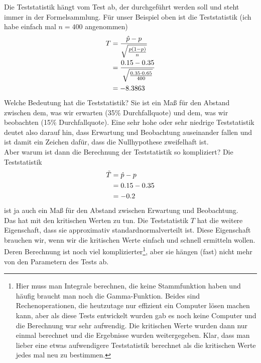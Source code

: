 \documentclass{article}
\begin{document}
	Die Teststatistik hängt vom Test ab, der durchgeführt werden soll und steht immer in der Formelsammlung. Für unser Beispiel oben ist die Teststatistik (ich habe einfach mal $n=400$ angenommen)
	\begin{align}
		T &= \frac{\hat{p} - p}{\sqrt{\frac{p(1-p)}{n}}} \notag \\
		&= \frac{0.15-0.35}{\sqrt{\frac{0.35\cdot 0.65}{400}}} \notag \\
		&= -8.3863 \notag
	\end{align}
	Welche Bedeutung hat die Teststatistik? Sie ist ein Maß für den Abstand zwischen dem, was wir erwarten (35\% Durchfallquote) und dem, was wir beobachten (15\% Durchfallquote). Eine sehr hohe oder sehr niedrige Teststatistik deutet also darauf hin, dass Erwartung und Beobachtung auseinander fallen und ist damit ein Zeichen dafür, dass die Nullhypothese zweifelhaft ist. \\
	Aber warum ist dann die Berechnung der Teststatistik so kompliziert? Die Teststatistik
	\begin{align}
		\tilde{T} &= \hat{p} - p \notag \\
		&= 0.15 - 0.35 \notag \\
		&= -0.2 \notag
	\end{align}
	ist ja auch ein Maß für den Abstand zwischen Erwartung und Beobachtung. \\
	Das hat mit den kritischen Werten zu tun. Die Teststatistik $T$ hat die weitere Eigenschaft, dass sie approximativ standardnormalverteilt ist. Diese Eigenschaft brauchen wir, wenn wir die kritischen Werte einfach und schnell ermitteln wollen. Deren Berechnung ist noch viel komplizierter\footnote{Hier muss man Integrale berechnen, die keine Stammfunktion haben und häufig braucht man noch die Gamma-Funktion. Beides sind Rechenoperationen, die heutzutage nur effizient ein Computer lösen machen kann, aber als diese Tests entwickelt wurden gab es noch keine Computer und die Berechnung war sehr aufwendig. Die kritischen Werte wurden dann nur einmal berechnet und die Ergebnisse wurden weitergegeben. Klar, dass man lieber eine etwas aufwendigere Teststatistik berechnet als die kritischen Werte jedes mal neu zu bestimmen.}, aber sie hängen (fast) nicht mehr von den Parametern des Tests ab.
	
\end{document}
